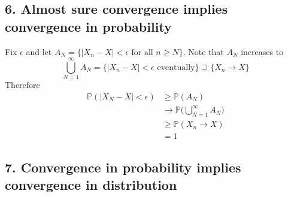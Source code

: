 \documentclass{article}
\begin{document}
\subsection*{6. Almost sure convergence implies convergence in probability}
Fix $\epsilon$ and let
$A_N = \{|X_n - X| < \epsilon \text{ for all } n \geq N\}$.
Note that $A_N$ increases to
$$\bigcup_{N=1}^\infty A_N = \{|X_n - X| < \epsilon \text{ eventually}\}
\supseteq \{X_n \to X\}$$
%
Therefore
\begin{align*}
  \mathbb{P}(|X_N - X| < \epsilon)
  &\geq \mathbb{P}(A_N) \\
  &\to \mathbb{P}\Big(\bigcup_{N=1}^\infty A_N\Big) \\
  &\geq \mathbb{P}(X_n \to X) \\
  &= 1
\end{align*}

\subsection*{7. Convergence in probability implies convergence in distribution}
\end{document}
